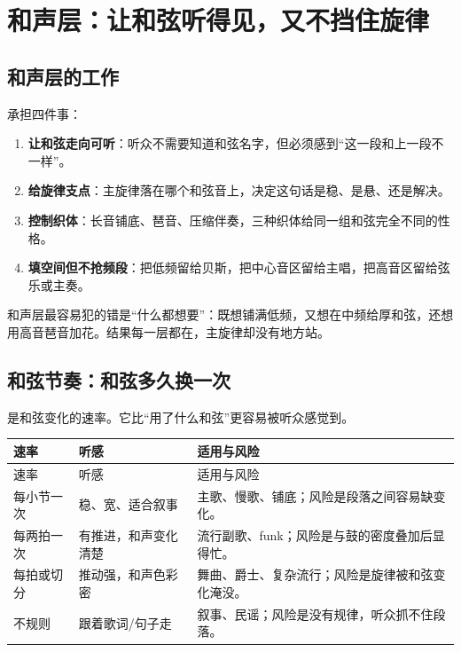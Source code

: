 \chapter{和声层：让和弦听得见，又不挡住旋律}
\label{ch:harmony}


\section{和声层的工作}
\label{sec:harmony-job}

承担四件事：

\begin{enumerate}
\item \textbf{让和弦走向可听}：听众不需要知道和弦名字，但必须感到“这一段和上一段不一样”。
\item \textbf{给旋律支点}：主旋律落在哪个和弦音上，决定这句话是稳、是悬、还是解决。
\item \textbf{控制织体}：长音铺底、琶音、压缩伴奏，三种织体给同一组和弦完全不同的性格。
\item \textbf{填空间但不抢频段}：把低频留给贝斯，把中心音区留给主唱，把高音区留给弦乐或主奏。
\end{enumerate}

和声层最容易犯的错是“什么都想要”：既想铺满低频，又想在中频给厚和弦，还想用高音琶音加花。结果每一层都在，主旋律却没有地方站。

\section{和弦节奏：和弦多久换一次}
\label{sec:harmonic-rhythm}

是和弦变化的速率。它比“用了什么和弦”更容易被听众感觉到。

\begin{longtable}{p{}p{}p{}}
\toprule
速率 & 听感 & 适用与风险 \\
\midrule
\endfirsthead
\toprule
速率 & 听感 & 适用与风险 \\
\midrule
\endhead
每小节一次 & 稳、宽、适合叙事 & 主歌、慢歌、铺底；风险是段落之间容易缺变化。 \\
每两拍一次 & 有推进，和声变化清楚 & 流行副歌、funk；风险是与鼓的密度叠加后显得忙。 \\
每拍或切分 & 推动强，和声色彩密 & 舞曲、爵士、复杂流行；风险是旋律被和弦变化淹没。 \\
不规则 & 跟着歌词/句子走 & 叙事、民谣；风险是没有规律，听众抓不住段落。 \\
\bottomrule
\end{longtable}

